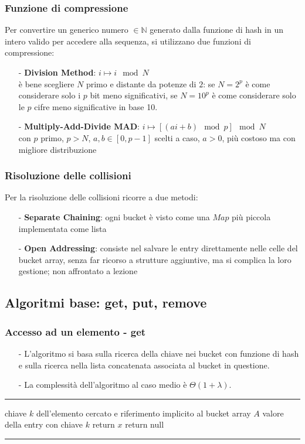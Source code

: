 \documentclass[a4paper]{article}
\makeatletter
\newenvironment{algo}[4]{
	\noindent\rule{\textwidth}{0.4pt}
	\begin{algorithmic}[1]
		\addtocounter{ALG@line}{-1}
		\Procedure{#1}{#2}
		\Require #3
		\Ensure #4
		\Statex }{
		\EndProcedure
	\end{algorithmic}
	\rule{\textwidth}{0.4pt}}
\makeatother
\begin{document}
\subsubsection*{Funzione di compressione}
Per convertire un generico numero \(\in \mathbb{N}\) generato dalla funzione di hash in un intero valido per accedere alla sequenza,
si utilizzano due funzioni di compressione:
\begin{itemize}[topsep=3pt, itemsep=0pt]
	\item[-] \textbf{Division Method}: \(i \mapsto i \mod N\) \\
	è bene scegliere \(N\) primo e distante da potenze di \(2\): se \(N = 2^p\) è come considerare solo i \(p\) bit meno
	significativi, se \(N = 10^p\) è come considerare solo le \(p\) cifre meno significative in base 10.
	\item[-] \textbf{Multiply-Add-Divide MAD}: \(i \mapsto [(ai+b) \mod p] \mod N\) \\
	con \(p\) primo, \(p > N\), \(a,b \in [0,p-1]\) scelti a caso, \(a > 0\), più costoso ma con migliore distribuzione
\end{itemize}

\subsubsection*{Risoluzione delle collisioni}
Per la risoluzione delle collisioni ricorre a due metodi:
\begin{itemize}[topsep=3pt, itemsep=0pt]
	\item[-] \textbf{Separate Chaining}: ogni bucket è visto come una \(Map\) più piccola implementata come lista
	\item[-] \textbf{Open Addressing}: consiste nel salvare le entry direttamente nelle celle del bucket array, senza far ricorso
	a strutture aggiuntive, ma si complica la loro gestione; non affrontato a lezione
\end{itemize}

\newpage

\subsection{Algoritmi base: get, put, remove}
\subsubsection*{Accesso ad un elemento - get}
\begin{itemize}[topsep=3pt, itemsep=0pt]
	\item[-] L'algoritmo si basa sulla ricerca della chiave nei bucket con funzione di hash e sulla ricerca nella lista concatenata
	associata al bucket in questione.
	\item[-] La complessità dell'algoritmo al caso medio è \(\Theta(1+\lambda)\).
\end{itemize}
\begin{algo}{get}{$k$}{chiave $k$ dell'elemento cercato e riferimento implicito al bucket array $A$}{valore della entry con chiave $k$}
		\State return $x$
	\Else
		\State return null
	\EndIf
\end{algo}
\end{document}

